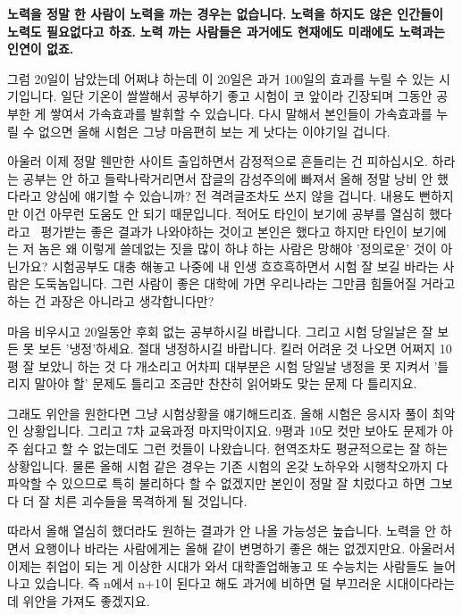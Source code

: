 \textbf{노력을 정말 한 사람이 노력을 까는 경우는 없습니다.}
\textbf{노력을 하지도 않은 인간들이 노력도 필요없다고 하죠.}
\textbf{노력 까는 사람들은 과거에도 현재에도 미래에도 노력과는 인연이 없죠.}
\vspace{5mm}

그럼 20일이 남았는데 어쩌냐 하는데
이 20일은 과거 100일의 효과를 누릴 수 있는 시기입니다.
일단 기온이 쌀쌀해서 공부하기 좋고 시험이 코 앞이라 긴장되며 그동안 공부한 게 쌓여서 가속효과를 발휘할 수 있습니다.
다시 말해서 본인들이 가속효과를 누릴 수 없으면 올해 시험은 그냥 마음편히 보는 게 낫다는 이야기일 겁니다.
\vspace{5mm}

아울러 이제 정말 웬만한 사이트 출입하면서 감정적으로 흔들리는 건 피하십시오.
하라는 공부는 안 하고 들락나락거리면서 잡글의 감성주의에 빠져서 올해 정말 낭비 안 했다라고 양심에 얘기할 수 있습니까?
전 격려글조차도 쓰지 않을 겁니다. 내용도 뻔하지만 이건 아무런 도움도 안 되기 때문입니다.
적어도 타인이 보기에 공부를 열심히 했다라고  평가받는 좋은 결과가 나와야하는 것이고
본인은 했다고 하지만 타인이 보기에는 저 놈은 왜 이렇게 쓸데없는 짓을 많이 하냐 하는 사람은 망해야 '정의로운' 것이 아닌가요?
시험공부도 대충 해놓고 나중에 내 인생 흐흐흑하면서 시험 잘 보길 바라는 사람은 도둑놈입니다.
그런 사람이 좋은 대학에 가면 우리나라는 그만큼 힘들어질 거라고 하는 건 과장은 아니라고 생각합니다만?
\vspace{5mm}

마음 비우시고 20일동안 후회 없는 공부하시길 바랍니다.
그리고 시험 당일날은 잘 보든 못 보든 '냉정'하세요. 절대 냉정하시길 바랍니다.
킬러 어려운 것 나오면 어쩌지 10평 잘 보았니 하는 것 다 개소리고
어차피 대부분은 시험 당일날 냉정을 못 지켜서 '틀리지 말아야 할' 문제도 틀리고
조금만 찬찬히 읽어봐도 맞는 문제 다 틀리지요.
\vspace{5mm}

그래도 위안을 원한다면 그냥 시험상황을 얘기해드리죠.
올해 시험은 응시자 풀이 최악인 상황입니다. 그리고 7차 교육과정 마지막이지요.
9평과 10모 컷만 보아도 문제가 아주 쉽다고 할 수 없는데도 그런 컷들이 나왔습니다. 현역조차도 평균적으로는 잘 하는 상황입니다.
물론 올해 시험 같은 경우는 기존 시험의 온갖 노하우와 시행착오까지 다 파악할 수 있으므로 특히 불리하다 할 수 없겠지만
본인이 정말 잘 치렀다고 하면 그보다 더 잘 치른 괴수들을 목격하게 될 것입니다.
\vspace{5mm}

따라서 올해 열심히 했더라도 원하는 결과가 안 나올 가능성은 높습니다.
노력을 안 하면서 요행이나 바라는 사람에게는 올해 같이 변명하기 좋은 해는 없겠지만요.
아울러서 이제는 취업이 되는 게 이상한 시대가 와서 대학졸업해놓고 또 수능치는 사람들도 늘어나고 있습니다.
즉 n에서 n+1이 된다고 해도 과거에 비하면 덜 부끄러운 시대이다라는 데 위안을 가져도 좋겠지요.
\vspace{5mm}


